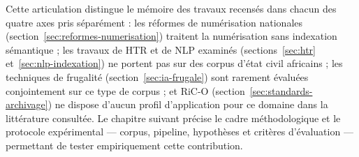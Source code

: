 Cette articulation distingue le mémoire des travaux recensés dans chacun des quatre axes pris séparément : les réformes de numérisation nationales (section~\ref{sec:reformes-numerisation}) traitent la numérisation sans indexation sémantique ; les travaux de HTR et de NLP examinés (sections~\ref{sec:htr} et~\ref{sec:nlp-indexation}) ne portent pas sur des corpus d'état civil africains ; les techniques de frugalité (section~\ref{sec:ia-frugale}) sont rarement évaluées conjointement sur ce type de corpus ; et RiC-O (section~\ref{sec:standards-archivage}) ne dispose d'aucun profil d'application pour ce domaine dans la littérature consultée. Le chapitre suivant précise le cadre méthodologique et le protocole expérimental --- corpus, pipeline, hypothèses et critères d'évaluation --- permettant de tester empiriquement cette contribution.